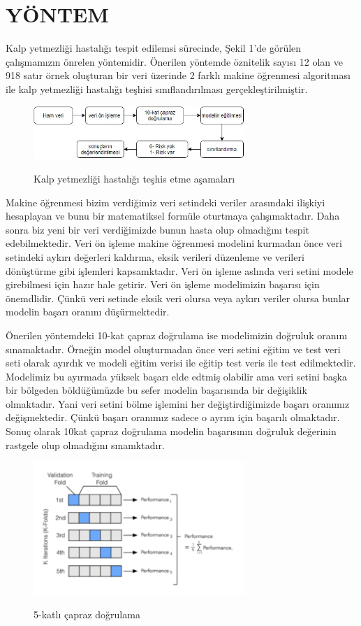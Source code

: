 \documentclass[conference]{IEEEtran}
\begin{document}
\section{YÖNTEM}
Kalp yetmezliği hastalığı tespit edilemsi sürecinde, Şekil 1'de görülen çalışmamızın önrelen yöntemidir.
Önerilen yöntemde öznitelik sayısı 12 olan ve 918 satır örnek oluşturan bir veri üzerinde 2 farklı makine öğrenmesi algoritması ile kalp yetmezliği hastalığı teşhisi sınıflandırılması gerçekleştirilmiştir.
\begin{figure}[htbp]
    \centering
   	\includegraphics[width=8cm]{images/yontem.JPG}\\
	\caption{Kalp yetmezliği hastalığı teşhis etme aşamaları}
    \label{fig}
\end{figure}

Makine öğrenmesi bizim verdiğimiz veri setindeki veriler arasındaki ilişkiyi hesaplayan ve bunu bir matematiksel formüle oturtmaya çalışımaktadır. Daha sonra biz yeni bir veri verdiğimizde bunun hasta olup olmadığını tespit edebilmektedir. Veri ön işleme makine öğrenmesi modelini kurmadan önce veri setindeki aykırı değerleri kaldırma, eksik verileri düzenleme ve verileri dönüştürme gibi işlemleri kapsamktadır. Veri ön işleme aslında veri setini modele girebilmesi için hazır hale getirir. Veri ön işleme modelimizin başarısı için önemdlidir. Çünkü veri setinde eksik veri olursa veya aykırı veriler olursa bunlar modelin başarı oranını düşürmektedir. 

Önerilen yöntemdeki 10-kat çapraz doğrulama ise modelimizin doğruluk oranını sınamaktadır. Örneğin model oluşturmadan önce veri setini eğitim ve test veri seti olarak ayırdık ve modeli eğitim verisi ile eğitip test veris ile test edilmektedir. Modelimiz bu ayırmada yüksek başarı elde edtmiş olabilir ama veri setini başka bir bölgeden böldüğümüzde bu sefer modelin başarısında bir değişiklik olmaktadır. Yani veri setini bölme işlemini her değiştirdiğimizde başarı oranımız değişmektedir. Çünkü başarı oranımız sadece o ayrım için başarılı olmaktadır. Sonuç olarak 10kat çapraz doğrulama modelin başarısının doğruluk değerinin rastgele olup olmadığını sınamktadır.
\begin{figure}[htbp]
    \centering
   	\includegraphics[width=8cm]{images/caprazlama.PNG}\\
	\caption{5-katlı çapraz doğrulama\cite{resim}}
    \label{fig}
\end{figure}
\end{document}

